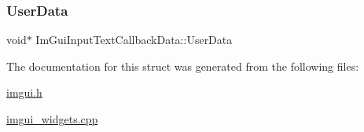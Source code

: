 \subsubsection{\texorpdfstring{User\+Data}{UserData}}
{\footnotesize\ttfamily void$\ast$ Im\+Gui\+Input\+Text\+Callback\+Data\+::\+User\+Data}



The documentation for this struct was generated from the following files\+:\begin{DoxyCompactItemize}
\item 
\mbox{\hyperlink{imgui_8h}{imgui.\+h}}\item 
\mbox{\hyperlink{imgui__widgets_8cpp}{imgui\+\_\+widgets.\+cpp}}\end{DoxyCompactItemize}

